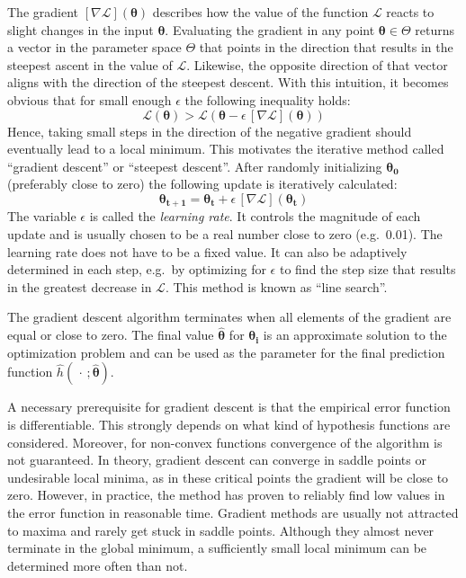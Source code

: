 The gradient $[\nabla\mathcal{L}](\boldsymbol{\theta})$ describes how the value of the function $\mathcal{L}$ reacts to slight changes in the input $\boldsymbol{\theta}$.
Evaluating the gradient in any point $\boldsymbol{\theta} \in \Theta$ returns a vector in the parameter space $\Theta$ that points in the direction that results in the steepest ascent in the value of $\mathcal{L}$.
Likewise, the opposite direction of that vector aligns with the direction of the steepest descent.
With this intuition, it becomes obvious that for small enough $\epsilon$ the following inequality holds:
\[
    \mathcal{L}(\boldsymbol{\theta}) > \mathcal{L}(\boldsymbol{\theta} - \epsilon\,[\nabla\mathcal{L}](\boldsymbol{\theta}))
\]
Hence, taking small steps in the direction of the negative gradient should eventually lead to a local minimum.
This motivates the iterative method called \enquote{gradient descent} or \enquote{steepest descent}.
After randomly initializing $\boldsymbol{\theta_0}$ (preferably close to zero) the following update is iteratively calculated:
\[
    \boldsymbol{\theta_{t+1}} = \boldsymbol{\theta_{t}} + \epsilon\,[\nabla\mathcal{L}](\boldsymbol{\theta_{t}})
\]
The variable $\epsilon$ is called the \textit{learning rate}.
It controls the magnitude of each update and is usually chosen to be a real number close to zero (e.g.\ 0.01). %
The learning rate does not have to be a fixed value.
It can also be adaptively determined in each step, e.g.\ by optimizing for $\epsilon$ to find the step size that results in the greatest decrease in $\mathcal{L}$.
This method is known as \enquote{line search}.

The gradient descent algorithm terminates when all elements of the gradient are equal or close to zero.
The final value $\boldsymbol{\hat{\theta}}$ for $\boldsymbol{\theta_{i}}$ is an approximate solution to the optimization problem and can be used as the parameter for the final prediction function $\hat{h}(\,\cdot\,; \boldsymbol{\hat{\theta}})$.

A necessary prerequisite for gradient descent is that the empirical error function is differentiable.
This strongly depends on what kind of hypothesis functions are considered.
Moreover, for non-convex functions convergence of the algorithm is not guaranteed.
In theory, gradient descent can converge in saddle points or undesirable local minima, as in these critical points the gradient will be close to zero.
However, in practice, the method has proven to reliably find low values in the error function in reasonable time.
Gradient methods are usually not attracted to maxima and rarely get stuck in saddle points.
Although they almost never terminate in the global minimum, a sufficiently small local minimum can be determined more often than not.

